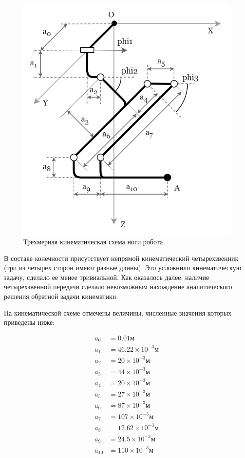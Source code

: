 \begin{figure}[h]
    \centering
    \includegraphics[scale=0.5]{chapter_kinematics/figure1.png}
    \caption{Трехмерная кинематическая схема ноги робота}
    \label{}
\end{figure}

В составе конечности присутствует непрямой кинематический четырехзвенник (три из четырех сторон имеют разные длины). Это усложнило кинематическую задачу, сделало ее менее тривиальной. Как оказалось далее, наличие четырехзвенной передачи сделало невозможным нахождение аналитического решения обратной задачи кинематики.

На кинематической схеме отмечены величины, численные значения которых приведены ниже:

\begin{align*}
    a_0&=0.01 м \\
    a_1&=46.22 \times 10^{-3} м \\
    a_2&=20 \times 10^{-3} м \\
    a_3&=44 \times 10^{-3} м \\
    a_4&=20 \times 10^{-3} м \\
    a_5&=27 \times 10^{-3} м \\
    a_6&=87 \times 10^{-3} м \\
    a_7&=107 \times 10^{-3} м \\
    a_8&=12.62 \times 10^{-3} м \\
    a_9&=24.5 \times 10^{-3} м \\
    a_10&=110 \times 10^{-3} м
\end{align*}

